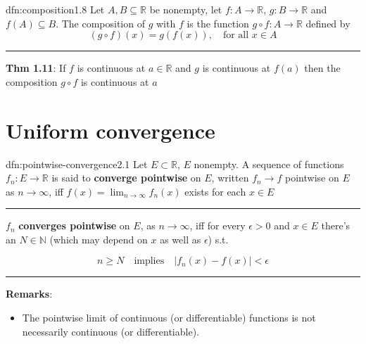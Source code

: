 \documentclass[landscape, 8pt]{extarticle}
\begin{document}
\begin{multicols}{3}

%

\vspace{-5pt}
\begin{dfn}[Composition]{dfn:composition}{1.8}
	Let $A, B \subseteq \mathbb{R}$ be nonempty, let $f : A \to \mathbb{R},\, g : B \to \mathbb{R}$ and $f(A) \subseteq B$. The composition of $g$ with $f$ is the function $g \circ f : A \to \mathbb{R}$ defined by
	\[(g \circ f)(x) = g(f(x)), \quad \text{for all $x\in A$}\]

	\vspace{-5pt}
	\noindent\rule{\textwidth}{0.2pt}

	\textbf{Thm 1.11}: If $f$ is continuous at $a\in \mathbb{R}$ and $g$ is continuous at $f(a)$ then the composition $g \circ f$ is continuous at $a$
\end{dfn}

\vspace{-15pt}
\section{Uniform convergence}

\begin{dfn}{dfn:pointwise-convergence}{2.1}
	\vspace{-5pt}
	Let $E \subset \mathbb{R}$, $E$ nonempty. A sequence of functions $f_{n}: E\to \mathbb{R}$ is said to \textbf{converge pointwise} on $E$, written $f_{n}\to f$ pointwise on $E$ as $n\to \infty$, iff $f(x) = \lim_{n \to \infty}f_{n}(x)$ exists for each $x \in E$

	\noindent\rule{\textwidth}{0.2pt}
	$f_{n}$ \textbf{converges pointwise} on $E$, as $n\to\infty$, iff for every $\epsilon>0$ and $x \in E$ there's an $N \in\mathbb{N}$ (which may depend on $x$ as well as $\epsilon$) s.t.

	\vspace{-8pt}
	\[n\ge N\quad\text{implies}\quad \lvert f_{n}(x)-f(x) \rvert < \epsilon\]

	\vspace{-5pt}
	\noindent\rule{\textwidth}{0.2pt}
	\textbf{Remarks}:
	\vspace{-5pt}
	\begin{itemize}[leftmargin=*]
		\setlength\itemsep{0em}
		\item The pointwise limit of continuous (or differentiable) functions is not necessarily continuous (or differentiable).


\end{itemize}
\end{dfn}
\end{multicols}
\end{document}
